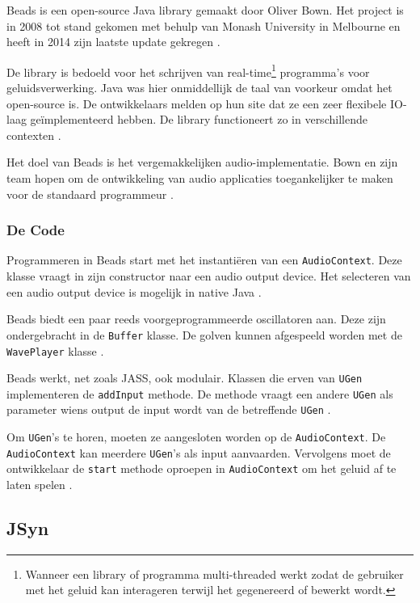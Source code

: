Beads is een open-source Java library gemaakt door Oliver Bown. Het project is in 2008 tot stand gekomen met behulp van Monash University in Melbourne en heeft in 2014 zijn laatste update gekregen \autocite{beads}.

De library is bedoeld voor het schrijven van real-time\footnote{Wanneer een library of programma multi-threaded werkt zodat de gebruiker met het geluid kan interageren terwijl het gegenereerd of bewerkt wordt.} programma's voor geluidsverwerking. Java was hier onmiddellijk de taal van voorkeur omdat het open-source is. De ontwikkelaars melden op hun site dat ze een zeer flexibele IO-laag geïmplementeerd hebben. De library functioneert zo in verschillende contexten \autocite{beads}. 

Het doel van Beads is het vergemakkelijken audio-implementatie. Bown en zijn team hopen om de ontwikkeling van audio applicaties toegankelijker te maken voor de standaard programmeur \autocite{beads2}.

\subsubsection*{De Code}

Programmeren in Beads start met het instantiëren van een \verb+AudioContext+. Deze klasse vraagt in zijn constructor naar een audio output device. Het selecteren van een audio output device is mogelijk in native Java \autocite{beadsdocs}.

Beads biedt een paar reeds voorgeprogrammeerde oscillatoren aan. Deze zijn ondergebracht in de \verb+Buffer+ klasse. De golven kunnen afgespeeld worden met de \verb+WavePlayer+ klasse \autocite{beadsdocs}.

Beads werkt, net zoals JASS, ook modulair. Klassen die erven van \verb+UGen+ implementeren de \verb+addInput+ methode. De methode vraagt een andere \verb+UGen+ als parameter wiens output de input wordt van de betreffende \verb+UGen+ \autocite{beadsdocs}.

Om \verb+UGen+'s te horen, moeten ze aangesloten worden op de \verb+AudioContext+. De \verb+AudioContext+ kan meerdere \verb+UGen+'s als input aanvaarden. Vervolgens moet de ontwikkelaar de \verb+start+ methode oproepen in \verb+AudioContext+ om het geluid af te laten spelen \autocite{beadsdocs}.

\subsection{JSyn}

